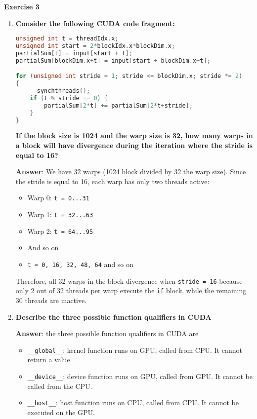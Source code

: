 \newpage

\begin{flushleft}
    \textcolor{Green3}{ \textbf{Exercise 3}}
\end{flushleft}
\begin{enumerate}[label=\Alph*.]
    \item \textcolor{Green3}{\textbf{Consider the following CUDA code fragment:}}
    \begin{lstlisting}[language=c++]
unsigned int t = threadIdx.x;
unsigned int start = 2*blockIdx.x*blockDim.x;
partialSum[t] = input[start + t];
partialSum[blockDim.x+t] = input[start + blockDim.x+t];

for (unsigned int stride = 1; stride <= blockDim.x; stride *= 2)
{
    __synchthreads();
    if (t % stride == 0) {
        partialSum[2*t] += partialSum[2*t+stride];
    }
}\end{lstlisting}
    \textcolor{Green3}{\textbf{If the block size is 1024 and the warp size is 32, how many warps in a block will have divergence during the iteration where the stride is equal to 16?}}

    \textbf{Answer}: We have 32 warps (1024 block divided by 32 the warp size). Since the stride is equal to 16, each warp has only two threads active:
    \begin{itemize}
        \item Warp 0: \texttt{t = 0...31}
        \item Warp 1: \texttt{t = 32...63}
        \item Warp 2: \texttt{t = 64...95}
        \item And so on
        \item \texttt{t = 0, 16, 32, 48, 64} and so on
    \end{itemize}
    Therefore, all 32 warps in the block divergence when \texttt{stride = 16} because only 2 out of 32 threads per warp execute the \texttt{if} block, while the remaining 30 threads are inactive.

    \item \textcolor{Green3}{\textbf{%
        Describe the three possible function qualifiers in CUDA
    }}
    
    \textbf{Answer}: the three possible function qualifiers in CUDA are
    \begin{itemize}
        \item \texttt{\_\_global\_\_}: kernel function runs on GPU, called from CPU. It cannot return a value.
        \item \texttt{\_\_device\_\_}: device function runs on GPU, called from GPU. It cannot be called from the CPU.
        \item \texttt{\_\_host\_\_}: host function runs on CPU, called from CPU. It cannot be executed on the GPU.
    \end{itemize}


\end{enumerate}

